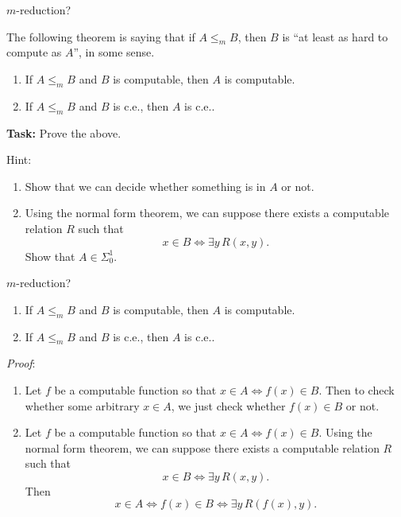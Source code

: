 \documentclass{beamer}
\begin{document}
\begin{frame}{$m$-reduction? \emojiflushed}

The following theorem is saying that if $A \leq_m B$, then $B$ is ``at least as hard to compute as $A$'', in some sense. 

\begin{theorem}
\begin{enumerate}
\item If $A \leq_m B$ and $B$ is computable, then $A$ is computable. 
\item If $A \leq_m B$ and $B$ is c.e., then $A$ is c.e..
\end{enumerate}
\end{theorem}


\textbf{Task:} Prove the above.

Hint: \begin{enumerate}
\item Show that we can decide whether something is in $A$ or not.
\item Using the normal form theorem, we can suppose there exists a computable relation $R$ such that
$$x \in B \Leftrightarrow \exists y \, R(x, y).$$
Show that $A \in \Sigma_0^1$.
\end{enumerate}

\end{frame}

\begin{frame}{$m$-reduction? \emojiflushed}
\begin{theorem}
\begin{enumerate}
\item If $A \leq_m B$ and $B$ is computable, then $A$ is computable. 
\item If $A \leq_m B$ and $B$ is c.e., then $A$ is c.e..
\end{enumerate}
\end{theorem}

\textit{Proof}: 
\begin{enumerate}
\item Let $f$ be a computable function so that $x \in A \Leftrightarrow f(x) \in B$. Then to check whether some arbitrary $x \in A$, we just check whether $f(x) \in B$ or not. 
\item Let $f$ be a computable function so that $x \in A \Leftrightarrow f(x) \in B$. Using the normal form theorem, we can suppose there exists a computable relation $R$ such that
$$x \in B \Leftrightarrow \exists y \, R(x, y).$$
Then
$$x \in A \Leftrightarrow f(x) \in B \Leftrightarrow \exists y \, R(f(x), y).$$
\end{enumerate}

\end{frame}
\end{document}
